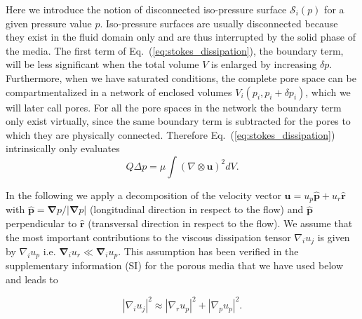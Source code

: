 \documentclass[draft]{agujournal2019}
\begin{document}
Here we introduce the notion of disconnected iso-pressure surface $\mathcal{S}_i(p)$ for a given pressure value $p$. Iso-pressure surfaces are usually disconnected because they exist in the fluid domain only and are thus interrupted by the solid phase of the media. The first term of Eq.~(\ref{eq:stokes_dissipation}), the boundary term, will be less significant when the total volume $V$ is enlarged by increasing $\delta p$. Furthermore, when we have saturated conditions, the complete pore space can be compartmentalized in a network of enclosed volumes $V_i(p_i, p_i+\delta p_i )$, which we will later call pores. For all the pore spaces in the network the boundary term only exist virtually, since the same boundary term is subtracted for the pores to which they are physically connected. Therefore Eq.~(\ref{eq:stokes_dissipation}) intrinsically only evaluates
\begin{equation}
Q \Delta p=\mu\int (\nabla \otimes \mathbf{u})^2 dV.\label{eq:pore_based_energy_dissipation}
\end{equation}

In the following we apply a decomposition of the velocity vector  $\mathbf{u} = u_p \mathbf{\hat{p}} + u_r \mathbf{\hat{r}}$ with $\mathbf{\hat{p}} =\mathbf{ \nabla}p/|\mathbf{ \nabla}p|$ (longitudinal direction in respect to the flow) and $\hat{\mathbf{p}}$ perpendicular to $\hat{\mathbf{r}}$ (transversal direction in respect to the flow). We assume that the most important contributions to the viscous dissipation tensor $\nabla_i u_j$ is given by $\nabla_i u_p$ i.e. $\mathbf{\nabla}_i u_r \ll \mathbf{\nabla}_i u_p $. This assumption has been verified in the supplementary information (SI) for the porous media that we have used below and leads to 

\begin{equation}
\left|\nabla_i u_j\right|^2 \approx  \left|\nabla_r u_p\right|^2 + \left|\nabla_p u_p\right|^2 .\label{eq:reduced_dissipation_tensor}
\end{equation}
\end{document}
